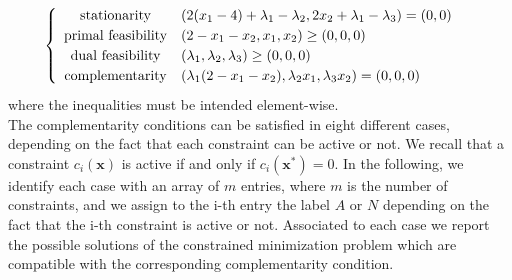 \documentclass[a4paper,11pt]{article}
\begin{document}
\begin{equation}
	\begin{cases}
	\begin{array}{c l}
	\text{stationarity} & (2(x_{1}-4) + \lambda_{1} -\lambda_{2}, 2x_{2}+\lambda_{1}-\lambda_{3}) = (0,0) \\
	\text{primal feasibility} &(2 - x_{1} -x_{2}, x_{1}, x_{2}) \ge (0,0,0) \\
	\text{dual feasibility} & (\lambda_{1}, \lambda_{2}, \lambda_{3}) \ge (0,0,0) \\
	\text{complementarity} &(\lambda_{1}(2-x_{1}-x_{2}), \lambda_{2}x_{1}, \lambda_{3}x_{2}) = (0,0,0)
	\end{array}
	\end{cases}
	\label{eq:KKT system f_a}
\end{equation}
where the inequalities must be intended element-wise.\\

\noindent The complementarity conditions can be satisfied in eight different cases, depending on the fact that each constraint can be active or not. We recall that a constraint $c_{i}(\textbf{x})$ is active if and only if $c_{i}(\textbf{x}^*)=0$.
In the following, we identify each case with an array of $m$ entries, where $m$ is the number of constraints, and we assign to the i-th entry the label $A$ or $N$ depending on the fact that the i-th constraint is active or not. Associated to each case we report the possible solutions of the constrained minimization problem which are compatible with the corresponding complementarity condition.
\end{document}
